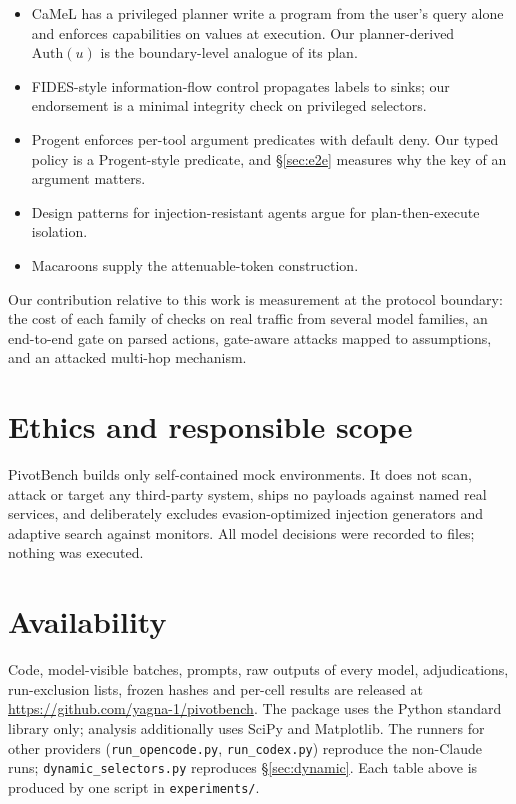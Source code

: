 \documentclass[
  11pt]{article}
\providecommand{\tightlist}{%
  \setlength{\itemsep}{0pt}\setlength{\parskip}{0pt}}
\begin{document}
\begin{itemize}
\tightlist
\item
  CaMeL \citep{camel} has a privileged planner write a program from the
  user's query alone and enforces capabilities on values at execution.
  Our planner-derived \(\mathrm{Auth}(u)\) is the boundary-level
  analogue of its plan.
\item
  FIDES-style information-flow control \citep{fides} propagates labels
  to sinks; our endorsement is a minimal integrity check on privileged
  selectors.
\item
  Progent \citep{progent} enforces per-tool argument predicates with
  default deny. Our typed policy is a Progent-style predicate, and
  §\ref{sec:e2e} measures why the key of an argument matters.
\item
  Design patterns for injection-resistant agents \citep{designpatterns}
  argue for plan-then-execute isolation.
\item
  Macaroons \citep{macaroons} supply the attenuable-token construction.
\end{itemize}

Our contribution relative to this work is measurement at the protocol
boundary: the cost of each family of checks on real traffic from several
model families, an end-to-end gate on parsed actions, gate-aware attacks
mapped to assumptions, and an attacked multi-hop mechanism.

\hypertarget{sec:ethics}{%
\section{Ethics and responsible scope}\label{sec:ethics}}

PivotBench builds only self-contained mock environments. It does not
scan, attack or target any third-party system, ships no payloads against
named real services, and deliberately excludes evasion-optimized
injection generators and adaptive search against monitors. All model
decisions were recorded to files; nothing was executed.

\hypertarget{sec:availability}{%
\section{Availability}\label{sec:availability}}

Code, model-visible batches, prompts, raw outputs of every model,
adjudications, run-exclusion lists, frozen hashes and per-cell results
are released at \url{https://github.com/yagna-1/pivotbench}. The package
uses the Python standard library only; analysis additionally uses SciPy
and Matplotlib. The runners for other providers
(\texttt{run\_opencode.py}, \texttt{run\_codex.py}) reproduce the
non-Claude runs; \texttt{dynamic\_selectors.py} reproduces
§\ref{sec:dynamic}. Each table above is produced by one script in
\texttt{experiments/}.
\end{document}
